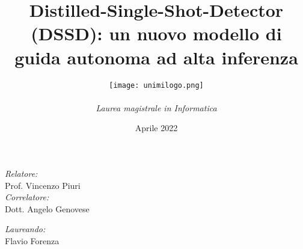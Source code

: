 \documentclass[10pt]{beamer}
\title[]{Distilled-Single-Shot-Detector (DSSD): un nuovo modello di guida autonoma ad alta inferenza}
\author[Flavio Forenza]{
                        \texttt{[image: 
                                        unimilogo.png]}\\ 
                                        \vspace{0.1cm}
                                        \fontfamily{cmr}\selectfont {\bfseries{UNIVERSITÀ DEGLI STUDI DI MILANO}}\\
                                        \fontfamily{cmr}\selectfont \emph{Laurea magistrale in Informatica}\\
                                        \vspace{1cm}
                                        }
\date{\scriptsize Aprile 2022}
\begin{document}
\begin{frame}
    \maketitle
    \vspace{-2.5cm}
    \begin{minipage}{\linewidth}
        \centering
        \begin{minipage}{0.45\linewidth}
            \begin{flushleft}
                \emph{Relatore:}\\
                Prof. Vincenzo Piuri\\
                \emph{Correlatore:}\\
                Dott. Angelo Genovese
            \end{flushleft}
        \end{minipage}
        \begin{minipage}{0.45\linewidth}
            \begin{flushright}
                \emph{Laureando:}\\
                Flavio Forenza
            \end{flushright}
        \end{minipage}
    \end{minipage}
\end{frame}






\end{document}
